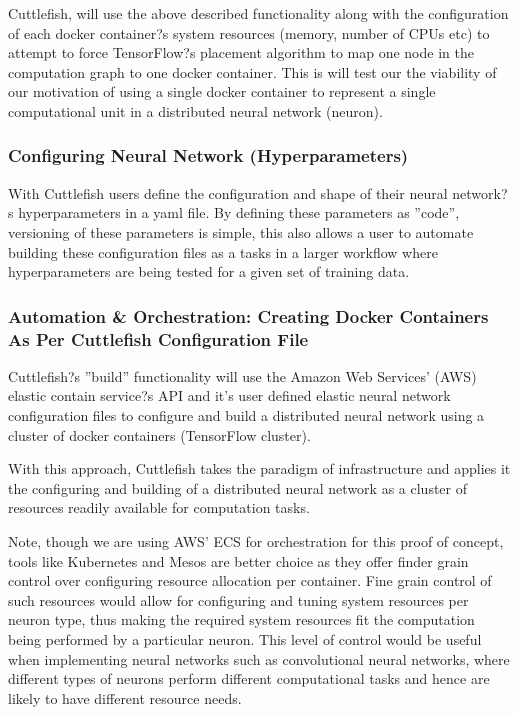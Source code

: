 \documentclass[conference]{IEEEtran}
\begin{document}
Cuttlefish, will use the above described functionality along with the configuration of each docker container?s system resources (memory, number of CPUs etc) to attempt to force TensorFlow?s placement algorithm to map one node in the computation graph to one docker container.  This is will test our the viability of our motivation of using a single docker container to represent a single computational unit in a distributed neural network (neuron).

\subsubsection{Configuring Neural Network (Hyperparameters)}
With Cuttlefish users define the configuration and shape of their neural network?s hyperparameters in a yaml file. By defining these parameters as ''code'', versioning of these parameters is simple, this also allows a user to automate building these configuration files as a tasks in a larger workflow where hyperparameters are being tested for a given set of training data.

\subsubsection{Automation \& Orchestration: Creating Docker Containers As Per Cuttlefish Configuration File}
Cuttlefish?s ''build'' functionality will use the Amazon Web Services' (AWS) elastic contain service?s API \cite{ecs-api} and it's user defined elastic neural network configuration files to configure and build a distributed neural network using a cluster of docker containers (TensorFlow cluster).

With this approach, Cuttlefish takes the paradigm of infrastructure and applies it the configuring and building of a distributed neural network as a cluster of resources readily available for computation tasks.

Note, though we are using AWS' ECS \cite{ecs-doc} for orchestration for this proof of concept, tools like Kubernetes and Mesos are better choice as they offer finder grain control over configuring resource allocation per container. Fine grain control of such resources would allow for configuring and tuning system resources per neuron type, thus making the required system resources fit the computation being performed by a particular neuron. This level of control would be useful when implementing neural networks such as convolutional neural networks, where different types of neurons perform different computational tasks and hence are likely to have different resource needs.
\end{document}
